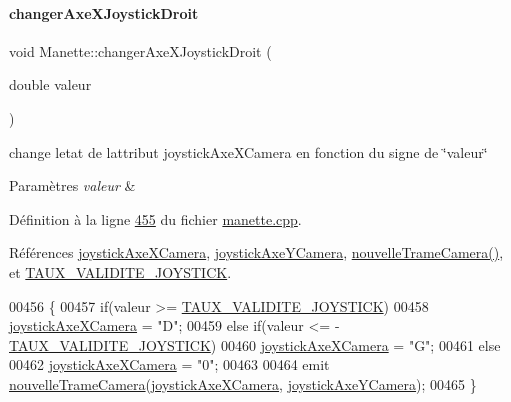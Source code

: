 \paragraph{\texorpdfstring{changer\+Axe\+X\+Joystick\+Droit}{changerAxeXJoystickDroit}}
{\footnotesize\ttfamily void Manette\+::changer\+Axe\+X\+Joystick\+Droit (\begin{DoxyParamCaption}\item[{double}]{valeur }\end{DoxyParamCaption})\hspace{0.3cm}{\ttfamily [slot]}}



change l\textquotesingle{}etat de l\textquotesingle{}attribut joystick\+Axe\+X\+Camera en fonction du signe de \char`\"{}valeur\char`\"{} 


\begin{DoxyParams}{Paramètres}
{\em valeur} & \\
\hline
\end{DoxyParams}


Définition à la ligne \hyperlink{manette_8cpp_source_l00455}{455} du fichier \hyperlink{manette_8cpp_source}{manette.\+cpp}.



Références \hyperlink{manette_8h_source_l00257}{joystick\+Axe\+X\+Camera}, \hyperlink{manette_8h_source_l00258}{joystick\+Axe\+Y\+Camera}, \hyperlink{class_manette_a229a449e851b5f716778d19c5cf2ba49}{nouvelle\+Trame\+Camera()}, et \hyperlink{manette_8h_source_l00020}{T\+A\+U\+X\+\_\+\+V\+A\+L\+I\+D\+I\+T\+E\+\_\+\+J\+O\+Y\+S\+T\+I\+CK}.


\begin{DoxyCode}
00456 \{
00457     \textcolor{keywordflow}{if}(valeur >= \hyperlink{manette_8h_a1ae244fc787303cd46a9b684fb4b4056}{TAUX\_VALIDITE\_JOYSTICK})
00458         \hyperlink{class_manette_a0ca05a5c08455e74c8d944b96d8124a6}{joystickAxeXCamera} = \textcolor{stringliteral}{"D"};
00459     \textcolor{keywordflow}{else} \textcolor{keywordflow}{if}(valeur <= -\hyperlink{manette_8h_a1ae244fc787303cd46a9b684fb4b4056}{TAUX\_VALIDITE\_JOYSTICK})
00460         \hyperlink{class_manette_a0ca05a5c08455e74c8d944b96d8124a6}{joystickAxeXCamera} = \textcolor{stringliteral}{"G"};
00461     \textcolor{keywordflow}{else}
00462         \hyperlink{class_manette_a0ca05a5c08455e74c8d944b96d8124a6}{joystickAxeXCamera} = \textcolor{stringliteral}{"0"};
00463 
00464     emit \hyperlink{class_manette_a229a449e851b5f716778d19c5cf2ba49}{nouvelleTrameCamera}(\hyperlink{class_manette_a0ca05a5c08455e74c8d944b96d8124a6}{joystickAxeXCamera}, 
      \hyperlink{class_manette_ab635d71c9e829d8950b9bbd13b9cdb01}{joystickAxeYCamera});
00465 \}
\end{DoxyCode}
\mbox{\label{class_manette_a82a0d2535dd1dd9ea4021aa1fe71b1bc}} 
